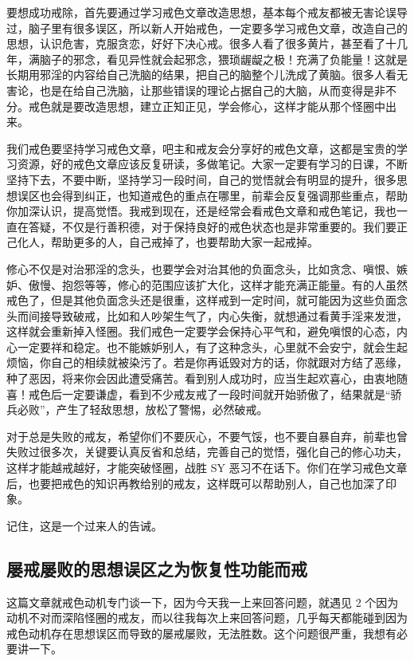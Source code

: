 \documentclass[fontset=founder]{ctexart}
\begin{document}
要想成功戒除，首先要通过学习戒色文章改造思想，基本每个戒友都被无害论误导过，脑子里有很多误区，所以新人开始戒色，一定要多学习戒色文章，改造自己的思想，认识危害，克服贪恋，好好下决心戒。很多人看了很多黄片，甚至看了十几年，满脑子的邪念，看见异性就会起邪念，猥琐龌龊之极！充满了负能量！这就是长期用邪淫的内容给自己洗脑的结果，把自己的脑整个儿洗成了黄脑。很多人看无害论，也是在给自己洗脑，让那些错误的理论占据自己的大脑，从而变得是非不分。戒色就是要改造思想，建立正知正见，学会修心，这样才能从那个怪圈中出来。

我们戒色要坚持学习戒色文章，吧主和戒友会分享好的戒色文章，这都是宝贵的学习资源，好的戒色文章应该反复研读，多做笔记。大家一定要有学习的日课，不断坚持下去，不要中断，坚持学习一段时间，自己的觉悟就会有明显的提升，很多思想误区也会得到纠正，也知道戒色的重点在哪里，前辈会反复强调那些重点，帮助你加深认识，提高觉悟。我戒到现在，还是经常会看戒色文章和戒色笔记，我也一直在答疑，不仅是行善积德，对于保持良好的戒色状态也是非常重要的。我们要正己化人，帮助更多的人，自己戒掉了，也要帮助大家一起戒掉。

修心不仅是对治邪淫的念头，也要学会对治其他的负面念头，比如贪念、嗔恨、嫉妒、傲慢、抱怨等等，修心的范围应该扩大化，这样才能充满正能量。有的人虽然戒色了，但是其他负面念头还是很重，这样戒到一定时间，就可能因为这些负面念头而间接导致破戒，比如和人吵架生气了，内心失衡，就想通过看黄手淫来发泄，这样就会重新掉入怪圈。我们戒色一定要学会保持心平气和，避免嗔恨的心态，内心一定要祥和稳定。也不能嫉妒别人，有了这种念头，心里就不会安宁，就会生起烦恼，你自己的相续就被染污了。若是你再诋毁对方的话，你就跟对方结了恶缘，种了恶因，将来你会因此遭受痛苦。看到别人成功时，应当生起欢喜心，由衷地随喜！戒色后一定要谦虚，看到不少戒友戒了一段时间就开始骄傲了，结果就是“骄兵必败”，产生了轻敌思想，放松了警惕，必然破戒。

对于总是失败的戒友，希望你们不要灰心，不要气馁，也不要自暴自弃，前辈也曾失败过很多次，关键要认真反省和总结，完善自己的觉悟，强化自己的修心功夫，这样才能越戒越好，才能突破怪圈，战胜 SY 恶习不在话下。你们在学习戒色文章后，也要把戒色的知识再教给别的戒友，这样既可以帮助别人，自己也加深了印象。

记住，这是一个过来人的告诫。

\subsection{屡戒屡败的思想误区之为恢复性功能而戒}

这篇文章就戒色动机专门谈一下，因为今天我一上来回答问题，就遇见 2 个因为动机不对而深陷怪圈的戒友，而以往我每次上来回答问题，几乎每天都能碰到因为戒色动机存在思想误区而导致的屡戒屡败，无法胜数。这个问题很严重，我想有必要讲一下。
\end{document}
